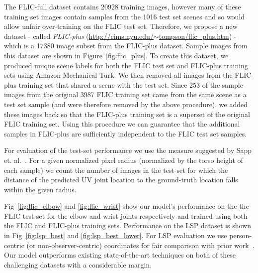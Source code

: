 The FLIC-full dataset contains 20928 training images, however many of these training set images contain samples from the 1016 test set scenes and so would allow unfair over-training on the FLIC test set. Therefore, we propose a new dataset - called \emph{FLIC-plus} (\href{http://cims.nyu.edu/~tompson/flic_plus.htm}{http://cims.nyu.edu/$\sim$tompson/flic\_plus.htm}) - which is a 17380 image subset from the FLIC-plus dataset. Sample images from this dataset are shown in Figure~\ref{fig:flic_plus}. To create this dataset, we produced unique scene labels for both the FLIC test set and FLIC-plus training sets using Amazon Mechanical Turk. We then removed all images from the FLIC-plus training set that shared a scene with the test set. Since 253 of the sample images from the original 3987 FLIC training set came from the same scene as a test set sample (and were therefore removed by the above procedure), we added these images back so that the FLIC-plus training set is a superset of the original FLIC training set. Using this procedure we can guarantee that the additional samples in FLIC-plus are sufficiently independent to the FLIC test set samples.

For evaluation of the test-set performance we use the measure suggested by Sapp et. al.~\cite{modec}. For a given normalized pixel radius (normalized by the torso height of each sample) we count the number of images in the test-set for which the distance of the predicted UV joint location to the ground-truth location falls within the given radius.

Fig~\ref{fig:flic_elbow} and \ref{fig:flic_wrist} show our model's performance on the the FLIC test-set for the elbow and wrist joints respectively and trained using both the FLIC and FLIC-plus training sets. Performance on the LSP dataset is shown in Fig~\ref{fig:lsp_best} and \ref{fig:lsp_best_lower}. For LSP evaluation we use person-centric (or non-observer-centric) coordinates for fair comparison with prior work~\cite{deeppose,dantone13cvpr}. Our model outperforms existing state-of-the-art techniques on both of these challenging datasets with a considerable margin.

